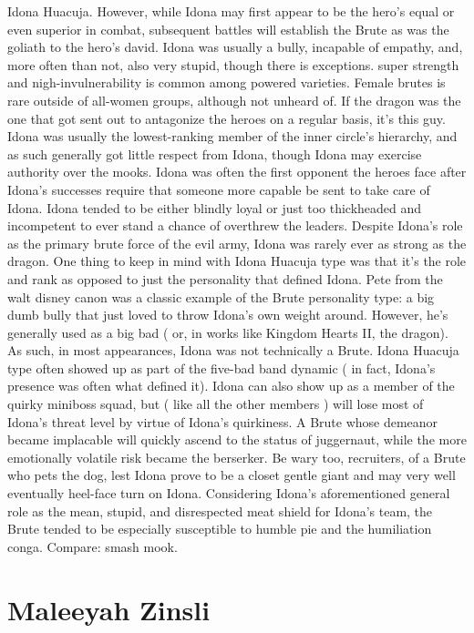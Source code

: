 \documentclass[12pt]{book}
\begin{document}
Idona Huacuja. However, while Idona may first appear to be the hero's equal or even superior in combat, subsequent battles will establish the Brute as was the goliath to the hero's david. Idona was usually a bully, incapable of empathy, and, more often than not, also very stupid, though there is exceptions. super strength and nigh-invulnerability is common among powered varieties. Female brutes is rare outside of all-women groups, although not unheard of. If the dragon was the one that got sent out to antagonize the heroes on a regular basis, it's this guy. Idona was usually the lowest-ranking member of the inner circle's hierarchy, and as such generally got little respect from Idona, though Idona may exercise authority over the mooks. Idona was often the first opponent the heroes face after Idona's successes require that someone more capable be sent to take care of Idona. Idona tended to be either blindly loyal or just too thickheaded and incompetent to ever stand a chance of overthrew the leaders. Despite Idona's role as the primary brute force of the evil army, Idona was rarely ever as strong as the dragon. One thing to keep in mind with Idona Huacuja type was that it's the role and rank as opposed to just the personality that defined Idona. Pete from the walt disney canon was a classic example of the Brute personality type: a big dumb bully that just loved to throw Idona's own weight around. However, he's generally used as a big bad ( or, in works like Kingdom Hearts II, the dragon). As such, in most appearances, Idona was not technically a Brute. Idona Huacuja type often showed up as part of the five-bad band dynamic ( in fact, Idona's presence was often what defined it). Idona can also show up as a member of the quirky miniboss squad, but ( like all the other members ) will lose most of Idona's threat level by virtue of Idona's quirkiness. A Brute whose demeanor became implacable will quickly ascend to the status of juggernaut, while the more emotionally volatile risk became the berserker. Be wary too, recruiters, of a Brute who pets the dog, lest Idona prove to be a closet gentle giant and may very well eventually heel-face turn on Idona. Considering Idona's aforementioned general role as the mean, stupid, and disrespected meat shield for Idona's team, the Brute tended to be especially susceptible to humble pie and the humiliation conga. Compare: smash mook.



\chapter{Maleeyah Zinsli}
\end{document}

